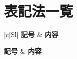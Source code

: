 \chapter{表記法一覧}
\setlength\cellspacetoplimit{4pt}
\setlength\cellspacebottomlimit{4pt}
\begin{longtable}{|c|Sl|}
\hline
{} %
\textbf{記号} & \textbf{内容}\\
\hline
\endfirsthead

\hline
{} %
\textbf{記号} & \textbf{内容}\\
\hline
\endhead

\hline
{} \\
\hline
\endfoot

\hline
\endlastfoot


\end{longtable}

